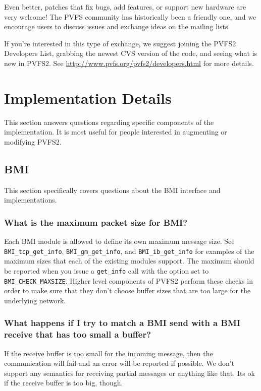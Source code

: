 \documentclass[11pt,letterpaper]{article}
\begin{document}
Even better, patches that fix bugs, add features, or support new hardware are
very welcome!  The PVFS community has historically been a friendly one, and we
encourage users to discuss issues and exchange ideas on the mailing lists.

If you're interested in this type of exchange, we suggest joining the PVFS2
Developers List, grabbing the newest CVS version of the code, and seeing what
is new in PVFS2.  See \url{http://www.pvfs.org/pvfs2/developers.html} for more
details.

%
%
\section{Implementation Details}

This section answers questions regarding specific components of the
implementation.  It is most useful for people interested in augmenting or
modifying PVFS2.

\subsection{BMI}

This section specifically covers questions about the BMI interface and
implementations.

\subsubsection{What is the maximum packet size for BMI?}

Each BMI module is allowed to define its own maximum message size.  See
\texttt{BMI\_tcp\_get\_info}, \texttt{BMI\_gm\_get\_info}, and
\texttt{BMI\_ib\_get\_info} for examples of the maximum sizes that each of the
existing modules support.  The maximum should be reported when you issue a
\texttt{get\_info} call with the option set to \texttt{BMI\_CHECK\_MAXSIZE}.
Higher level components of PVFS2 perform these checks in order to make sure
that they don't choose buffer sizes that are too large for the underlying
network.

\subsubsection{What happens if I try to match a BMI send with a BMI receive
               that has too small a buffer?}

If the receive buffer is too small for the incoming message, then the
communication will fail and an error will be reported if possible.  We
don't support any semantics for receiving partial messages or anything like
that.  Its ok if the receive buffer is too big, though.
    
\end{document}
